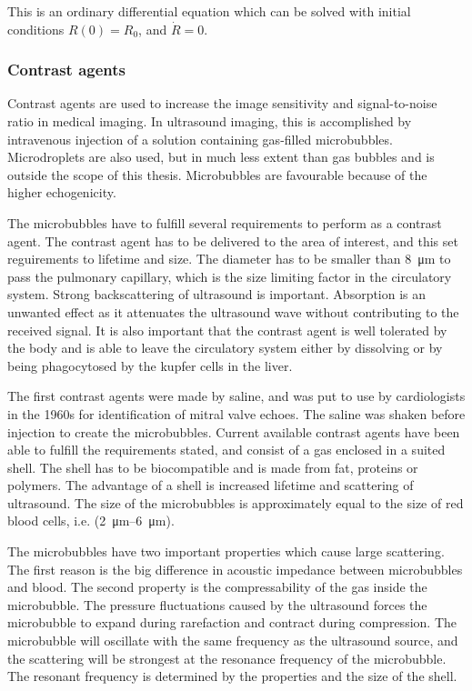This is an ordinary differential equation which can be solved with initial conditions $R(0) = R_0$, and $\dot{R} = 0$\cite{Moss2014}. 

\subsubsection{Contrast agents}
\label{contrast agents}

Contrast agents are used to increase the image sensitivity and signal-to-noise ratio in medical imaging. In ultrasound imaging, this is accomplished by intravenous injection of a solution containing gas-filled microbubbles. Microdroplets are also used\cite{Soman2006}, but in much less extent than gas bubbles and is outside the scope of this thesis. Microbubbles are favourable because of the higher echogenicity\cite{Talu2008}.

The microbubbles have to fulfill several requirements to perform as a contrast agent. The contrast agent has to be delivered to the area of interest, and this set reguirements to lifetime and size. The diameter has to be smaller than \SI{8}{\micro\metre} to pass the pulmonary capillary\cite{Tickner1980}, which is the size limiting factor in the circulatory system. Strong backscattering of ultrasound is important. Absorption is an unwanted effect as it attenuates the ultrasound wave without contributing to the received signal. It is also important that the contrast agent is well tolerated by the body and is able to leave the circulatory system either by dissolving or by being phagocytosed by the kupfer cells in the liver\cite{Healey2012}.

The first contrast agents were made by saline, and was put to use by cardiologists in the 1960s for identification of mitral valve echoes. The saline was shaken before injection to create the microbubbles. Current available contrast agents have been able to fulfill the requirements stated, and consist of a gas enclosed in a suited shell. The shell has to be biocompatible and is made from fat, proteins or polymers. The advantage of a shell is increased lifetime and scattering of ultrasound. The size of the microbubbles is approximately equal to the size of red blood cells, i.e. (\SIrange{2}{6}{\micro\metre}).

The microbubbles have two important properties which cause large scattering. The first reason is the big difference in acoustic impedance between microbubbles and blood. The second property is the compressability of the gas inside the microbubble. The pressure fluctuations caused by the ultrasound forces the microbubble to expand during rarefaction and contract during compression. The microbubble will oscillate with the same frequency as the ultrasound source, and the scattering will be strongest at the resonance frequency of the microbubble. The resonant frequency is determined by the properties and the size of the shell.

